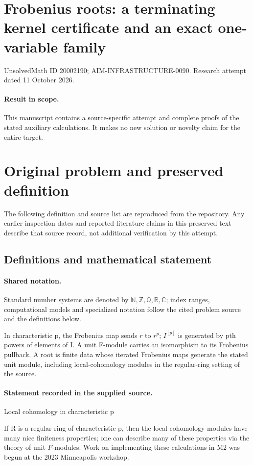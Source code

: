 \documentclass[11pt]{article}
\begin{document}
\section*{Frobenius roots: a terminating kernel certificate and an exact one-variable family}
\noindent UnsolvedMath ID 20002190; AIM-INFRASTRUCTURE-0090. Research attempt dated 11 October 2026.
\paragraph{Result in scope.}This manuscript contains a source-specific attempt and complete proofs of the stated auxiliary calculations. It makes no new solution or novelty claim for the entire target.
\section{Original problem and preserved definition}
The following definition and source list are reproduced from the repository. Any earlier inspection dates and reported literature claims in this preserved text describe that source record, not additional verification by this attempt.
\subsection{Definitions and mathematical statement}

\paragraph{Shared notation.}Standard number systems are denoted by $\mathbb N,\mathbb Z,\mathbb Q,\mathbb R,\mathbb C$; index ranges, computational models and specialized notation follow the cited problem source and the definitions below.


In characteristic p, the Frobenius map sends $r$ to $r^p$; $I^{[p]}$ is generated by pth powers of elements of I. A unit F-module carries an isomorphism to its Frobenius pullback. A root is finite data whose iterated Frobenius maps generate the stated unit module, including local-cohomology modules in the regular-ring setting of the source.
\paragraph{Statement recorded in the supplied source.}
Local cohomology in characteristic p

If R is a regular ring of characteristic p, then the local cohomology modules have many nice finiteness properties; one can describe many of these properties via the theory of unit $F$-modules. Work on implementing these calculations in M2 was begun at the 2023 Minneapolis workshop.
\end{document}
